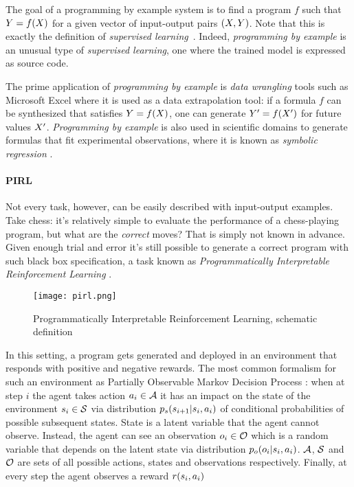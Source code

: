 The goal of a programming by example system is to find a program $f$ such that $Y=f(X)$ for a given vector of input-output pairs $(X,Y)$. 
Note that this is exactly the definition of \emph{supervised learning}~\cite{cunninghamSupervisedLearning2008}.
Indeed, \emph{programming by example} is an unusual type of \emph{supervised learning}, one where the trained model is expressed as source code.

The prime application of \emph{programming by example} is \emph{data wrangling} tools such as Microsoft Excel \cite{gulwaniProgrammingExamplesandIts2016} where it is used as a data extrapolation tool: if a formula $f$ can be synthesized that satisfies $Y=f(X)$, one can generate $Y '=f(X ')$ for future values $X '$.
\emph{Programming by example} is also used in scientific domains to generate formulas that fit experimental observations, where it is known as \emph{symbolic regression} \cite{makkeInterpretableScientificDiscovery2022}.

\paragraph{PIRL}

Not every task, however, can be easily described with input-output examples. 
Take chess: it's relatively simple to evaluate the performance of a chess-playing program, but what are the \emph{correct} moves? 
That is simply not known in advance.
Given enough trial and error it's still possible to generate a correct program with such black box specification, a task known as \emph{Programmatically Interpretable Reinforcement Learning} \cite{pirl}.

\begin{figure}[H]
    \centering
    \texttt{[image: pirl.png]}
    \caption{Programmatically Interpretable Reinforcement Learning, schematic definition}
    \label{fig:pirl}
\end{figure}

In this setting, a program gets generated and deployed in an environment that responds with positive and negative rewards. 
The most common formalism for such an environment as Partially Observable Markov Decision Process \cite{kramerjdavidrPartiallyObservableMarkov1964, spaanPartiallyObservableMarkov2012}: when at step $i$ the agent takes action $a_i \in \mathcal{A}$ it has an impact on  the state of the environment $s_i \in \mathcal{S}$ via distribution $p_s(s_{i+1} | s_i, a_i)$ of conditional probabilities of possible subsequent states. 
State is a latent variable that the agent cannot observe.
Instead, the agent can see an observation $o_i \in \mathcal{O}$ which is a random variable that depends on the latent state via distribution $p_o(o_i | s_i, a_i)$.
$\mathcal{A}$, $\mathcal{S}$ and $\mathcal{O}$ are sets of all possible actions, states and observations respectively.
Finally, at every step the agent observes a reward $r(s_i,a_i)$

